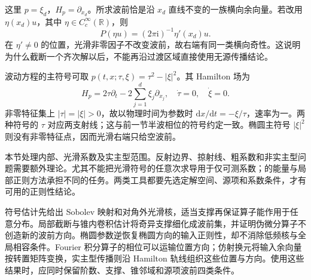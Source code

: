 这里 \(p=\xi_d\)，\(H_p=\partial_{x_d}\)。所求波前恰是沿 \(x_d\) 直线不变的一族横向余向量。若改用 \(\eta(x_d)u\)，其中 \(\eta\in C_c^\infty(\mathbb R)\)，则
\[
 P(\eta u)=(2\pi\mathrm i)^{-1}\eta'(x_d)u.
\]
在 \(\eta'\ne0\) 的位置，光滑非零因子不改变波前，故右端有同一类横向奇性。这说明为什么截断一个齐次解以后，不能再沿过渡区域直接使用无源传播结论。

\ProseParagraphBreak
波动方程的主符号可取 \(p(t,x;\tau,\xi)=\tau^2-|\xi|^2\)。其 Hamilton 场为
\[
 H_p=2\tau\partial_t-2\sum_{j=1}^d\xi_j\partial_{x_j},
 \quad \dot\tau=0,\quad\dot\xi=0.
\]
非零特征集上 \(|\tau|=|\xi|>0\)，故以物理时间为参数时 \(\mathrm dx/\mathrm dt=-\xi/\tau\)，速率为一。两种符号的 \(\tau\) 对应两支射线；这与前一节半波相位的符号约定一致。椭圆主符号 \(|\xi|^2\) 则没有非零特征点，因而光滑右端只给空波前。

本节处理内部、光滑系数及实主型范围。反射边界、掠射线、粗系数和非实主型问题需要额外理论。尤其不能把光滑符号的任意次求导用于仅可测系数；的能量与局部正则方法承担不同的任务。两类工具都要先选定解空间、源项和系数条件，才有可用的正则性结论。

\begin{chaptersummary}
符号估计先给出 Sobolev 映射和对角外光滑核，适当支撑再保证算子能作用于任意分布。局部截断与锥内卷积估计将奇异支撑细化成波前集，并证明伪微分算子不创造新的波前方向。椭圆参数逆恢复椭圆方向的输入正则性，却不消除低频核与全局相容条件。Fourier 积分算子的相位可以运输位置方向；仿射换元将输入余向量按转置矩阵变换，实主型传播则沿 Hamilton 轨线组织这些位置与方向。使用这些结果时，应同时保留阶数、支撑、锥邻域和源项波前四类条件。
\end{chaptersummary}

\BookExercises

